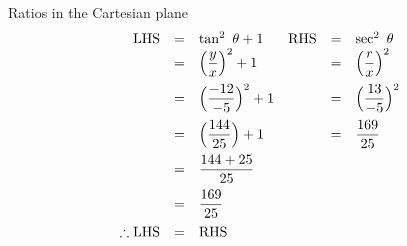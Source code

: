 \begin{wex}{Ratios in the Cartesian plane}
{
\begin{equation*}
\begin{array}{rclrcl}
 \hfill \mbox{LHS} &=&  \tan^{2}~\theta + 1 	&	\mbox{RHS}	&=&  	\sec^{2}~\theta \hfill \\
\hfill &=& \Big(\dfrac{y}{x}\Big)^{2} + 1  	&	&=& \Big(\dfrac{r}{x}\Big)^{2} \hfill \vspace{5pt} \\
\hfill&=&  \Big(\dfrac{-12}{-5}\Big)^{2} + 1 	&	&=& \Big(\dfrac{13}{-5}\Big)^{2} \hfill \vspace{5pt}\\
\hfill&=&  \Big (\dfrac{144}{25}\Big) + 1  	&	&=& \dfrac{169}{25} \hfill \vspace{5pt}\\
\hfill &=& \dfrac{144 + 25}{25} 		&	& & \hfill \vspace{5pt}\\
\hfill &=& \dfrac{169}{25}  			&	& & \hfill \vspace{5pt}\\
\hfill \therefore \mbox{LHS} &=& \mbox{RHS}&& \hfill
\end{array}
\end{equation*}
}
\end{wex}


